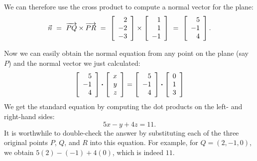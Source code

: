 \documentclass{ximera}
\begin{document}
\begin{solution}
    
    We can
    therefore use the cross product to compute a normal vector for the
    plane:
    \begin{equation*}
      \vect{n}
      ~=~
      \longvect{PQ} \times \longvect{PR}
      ~=~
      \startmat{r} 2 \\ -2 \\ -3 \stopmat
      \times
      \startmat{r} 1 \\ 1 \\ -1 \stopmat
      ~=~
      \startmat{r} 5 \\ -1 \\ 4 \stopmat.
    \end{equation*}
    \begin{center}
    \end{center}
    Now we can easily obtain the normal equation from any point on the
    plane (say $P$) and the normal vector we just calculated:
    \begin{equation*}
      \startmat{r} 5 \\ -1 \\ 4 \stopmat
      \dotprod
      \startmat{r} x \\ y \\ z \stopmat
      =
      \startmat{r} 5 \\ -1 \\ 4 \stopmat
      \dotprod
      \startmat{r} 0 \\ 1 \\ 3 \stopmat
    \end{equation*}
    We get the standard equation by computing the dot products on the
    left- and right-hand sides:
    \begin{equation*}
      5x - y + 4z = 11.
    \end{equation*}
    It is worthwhile to double-check the answer by substituting each of
    the three original points $P$, $Q$, and $R$ into this equation.
    For example, for $Q=(2,-1,0)$, we obtain $5(2)-(-1)+4(0)$, which is
    indeed $11$.
  \end{solution}
 
\end{document}
